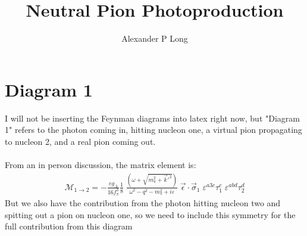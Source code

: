 \documentclass[11pt]{article}
\author{Alexander P Long}
\title{Neutral Pion Photoproduction}
\newcommand{\eps}{\epsilon}
\newcommand\ddfrac[2]{\frac{\displaystyle #1}{\displaystyle #2}}
\begin{document}
\maketitle
\section{Diagram 1}
I will not be inserting the Feynman diagrams into latex right now, but "Diagram 1" refers to the photon coming in, hitting nucleon one, a virtual pion propagating to nucleon 2, and a real pion coming out.\\~\\
From an in person discussion, the matrix element is:
\begin{align}
    \mathcal{M}_{1\to2}= -\frac{e g_A}{16 f_\pi^3}\frac{1}{8} \; \ddfrac{ \left( \omega+\sqrt{m^2_{\pi} + \vec{k}'^2} \right) }{\omega^2 -q^2 - m_\pi^2 + i \varepsilon}\; \vec{\eps}\cdot\vec{\sigma}_1\; \varepsilon^{a3c} \tau_1^c\;\varepsilon^{abd} \tau_2^d
\end{align}
But we also have the contribution from the photon hitting nucleon two and spitting out a pion on nucleon one, so we need to include this symmetry for the full contribution from this diagram
\end{document}

